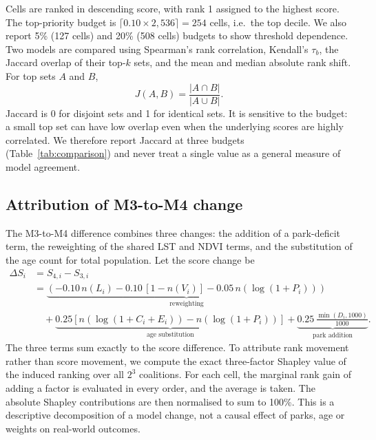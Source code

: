 \documentclass[times,twoside]{_Templates/MultiTargetManuscript}
\begin{document}
Cells are ranked in descending score, with rank 1 assigned to the highest score.
The top-priority budget is $\lceil 0.10 \times 2{,}536\rceil = 254$ cells, i.e.\
the top decile. We also report 5\% (127 cells) and 20\% (508 cells) budgets to
show threshold dependence. Two models are compared using Spearman's rank
correlation, Kendall's $\tau_b$, the Jaccard overlap of their top-$k$ sets,
and the mean and median absolute rank shift. For top sets $A$ and $B$,
\begin{equation}
J(A,B) = \frac{|A \cap B|}{|A \cup B|}.
\label{eq:jaccard}
\end{equation}
Jaccard is 0 for disjoint sets and 1 for identical sets. It is sensitive to the
budget: a small top set can have low overlap even when the underlying scores are
highly correlated. We therefore report Jaccard at three budgets
(Table~\ref{tab:comparison}) and never treat a single value as a general measure
of model agreement.

\subsection{Attribution of M3-to-M4 change}

The M3-to-M4 difference combines three changes: the addition of a park-deficit
term, the reweighting of the shared LST and NDVI terms, and the substitution of
the age count for total population. Let the score change be
\begin{equation}
\begin{split}
\Delta S_i &= S_{4,i} - S_{3,i} \\
&= \underbrace{\left(-0.10\,n(L_i)-0.10\,[1-n(V_i)]-0.05\,n(\log(1+P_i))\right)}_{\text{reweighting}} \\
&\quad + \underbrace{0.25\left[n(\log(1+C_i+E_i))-n(\log(1+P_i))\right]}_{\text{age substitution}}
+ \underbrace{0.25\,\frac{\min(D_i,1000)}{1000}}_{\text{park addition}}.
\end{split}
\label{eq:delta}
\end{equation}
The three terms sum exactly to the score difference. To attribute rank movement
rather than score movement, we compute the exact three-factor Shapley value of
the induced ranking over all $2^3$ coalitions. For each cell, the marginal rank
gain of adding a factor is evaluated in every order, and the average is taken.
The absolute Shapley contributions are then normalised to sum to 100\%. This is
a descriptive decomposition of a model change, not a causal effect of parks,
age or weights on real-world outcomes.
\end{document}

